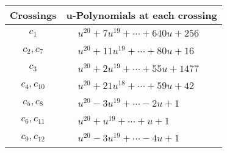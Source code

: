 \documentclass[1p]{elsarticle_modified}
\theoremstyle{definition}
\begin{document}
\begin{tabular}{m{50pt}|m{274pt}}
Crossings & \hspace{64pt}u-Polynomials at each crossing \\
\hline $$\begin{aligned}c_{1}\end{aligned}$$&$\begin{aligned}
&u^{20}+7 u^{19}+\cdots+640 u+256
\end{aligned}$\\
\hline $$\begin{aligned}c_{2},c_{7}\end{aligned}$$&$\begin{aligned}
&u^{20}+11 u^{19}+\cdots+80 u+16
\end{aligned}$\\
\hline $$\begin{aligned}c_{3}\end{aligned}$$&$\begin{aligned}
&u^{20}+2 u^{19}+\cdots+55 u+1477
\end{aligned}$\\
\hline $$\begin{aligned}c_{4},c_{10}\end{aligned}$$&$\begin{aligned}
&u^{20}+21 u^{18}+\cdots+59 u+42
\end{aligned}$\\
\hline $$\begin{aligned}c_{5},c_{8}\end{aligned}$$&$\begin{aligned}
&u^{20}-3 u^{19}+\cdots-2 u+1
\end{aligned}$\\
\hline $$\begin{aligned}c_{6},c_{11}\end{aligned}$$&$\begin{aligned}
&u^{20}+u^{19}+\cdots+u+1
\end{aligned}$\\
\hline $$\begin{aligned}c_{9},c_{12}\end{aligned}$$&$\begin{aligned}
&u^{20}-3 u^{19}+\cdots-4 u+1
\end{aligned}$\\
\hline
\end{tabular}\\~\\
\newpage\renewcommand{\arraystretch}{1}
\end{document}
